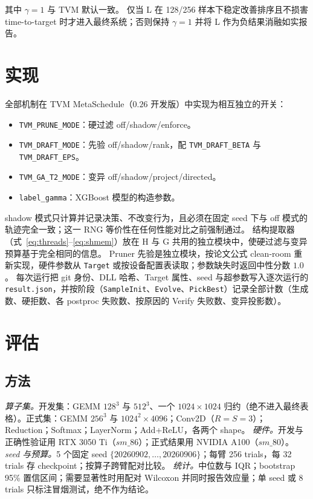 \documentclass[UTF8]{ctexart}
\begin{document}
其中 $\gamma=1$ 与 TVM 默认一致。
仅当 L 在 128/256 样本下稳定改善排序且不损害 time-to-target 时才进入最终系统；否则保持 $\gamma=1$ 并将 L 作为负结果消融如实报告。

\section{实现}
\label{sec:impl}

全部机制在 TVM MetaSchedule（$0.26$ 开发版）中实现为相互独立的开关：

\begin{itemize}
\item \texttt{TVM\_PRUNE\_MODE}：硬过滤 off/shadow/enforce。
\item \texttt{TVM\_DRAFT\_MODE}：先验 off/shadow/rank，配 \texttt{TVM\_DRAFT\_BETA} 与 \texttt{TVM\_DRAFT\_EPS}。
\item \texttt{TVM\_GA\_T2\_MODE}：变异 off/shadow/project/directed。
\item \texttt{label\_gamma}：XGBoost 模型的构造参数。
\end{itemize}

shadow 模式只计算并记录决策、不改变行为，且必须在固定 seed 下与 off 模式的轨迹完全一致；这一 RNG 等价性在任何性能对比之前强制通过。
结构提取器（式~\eqref{eq:threads}--\eqref{eq:shmem}）放在 H 与 G 共用的独立模块中，使硬过滤与变异预算基于完全相同的信息。
Pruner 先验是独立模块，按论文公式 clean-room 重新实现，硬件参数从 \texttt{Target} 或按设备配置表读取；参数缺失时返回中性分数 $1.0$。
每次运行把 git 身份、DLL 哈希、Target 属性、seed 与超参数写入逐次运行的 \texttt{result.json}，并按阶段（\texttt{SampleInit}、\texttt{Evolve}、\texttt{PickBest}）记录全部计数（生成数、硬拒数、各 postproc 失败数、按原因的 Verify 失败数、变异投影数）。

\section{评估}
\label{sec:eval}

\subsection{方法}

\emph{算子集。}开发集：GEMM $128^3$ 与 $512^3$、一个 $1024\times1024$ 归约（绝不进入最终表格）。正式集：GEMM $256^3$ 与 $1024^2\times4096$；Conv2D（$R{=}S{=}3$）；Reduction；Softmax；LayerNorm；Add+ReLU，各两个 shape。
\emph{硬件。}开发与正确性验证用 RTX 3050 Ti（$sm\_86$）；正式结果用 NVIDIA A100（$sm\_80$）。
\emph{seed 与预算。}5 个固定 seed $\{20260902,\dots,20260906\}$；每臂 256 trials，每 32 trials 存 checkpoint；按算子跨臂配对比较。
\emph{统计。}中位数与 IQR；bootstrap 95\% 置信区间；需要显著性时用配对 Wilcoxon 并同时报告效应量；单 seed 或 8 trials 只标注冒烟测试，绝不作为结论。
\end{document}
